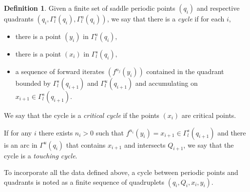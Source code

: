 \documentclass[a4paper,11pt]{article}
\theoremstyle{definition}
\newtheorem{definition}[lemma]{Definition}
\def\Ga{\Gamma}
\def\Ga{\Gamma}
\begin{document}




\begin{definition}\label{def-cycle-points}
Given a finite set of saddle periodic points $(q_i)$  and respective quadrants $(q_i, \Ga^s_l(q_i), \Ga^u_l(q_i))$, we say that there is a {\it cycle} if for each $i$, 
\begin{itemize}
    \item[--] there is a point $(y_i)$ in $\Ga^{u}_l(q_i),$
    \item[--] there is a point $(x_i)$ in $\Ga^{s}_l(q_i),$
     \item[--] a sequence of forward iterates $(f^{n_j}(y_i))$ contained in the quadrant bounded by  $\Ga^s_l(q_{i+1})$ and $\Ga^u_l(q_{i+1})$ and  accumulating on  $x_{i+1}\in \Ga^{s}_l(q_{i+1})$.
\end{itemize}


  


\noindent We say that the cycle is a {\it critical  cycle} if the points $(x_i)$ are critical points. 


\noindent If for any $i$ there exists $n_i>0$ such that $f^{n_i}(y_i)=x_{i+1} \in\Ga^s_l(q_{i+1})$ and there is an arc in $\Ga^u(q_i)$ that contains $x_{i+1}$ and intersects $Q_{i+1}$, we say that the cycle is a {\it touching cycle}. 




\end{definition}

To incorporate all the data defined above, a cycle between periodic points and quadrants is noted as a finite sequence of quadruplets $(q_i, Q_i, x_i, y_i).$



\end{document}
